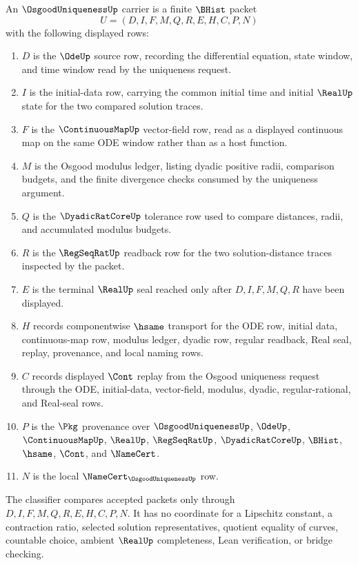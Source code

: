 \begin{definition}
\label{def:osgood-uniqueness-carrier}
An $\OsgoodUniquenessUp$ carrier is a finite $\BHist$ packet
$$
U=(D,I,F,M,Q,R,E,H,C,P,N)
$$
with the following displayed rows:
\begin{enumerate}
\item $D$ is the $\OdeUp$ source row, recording the differential equation, state window, and time window read by the uniqueness request.
\item $I$ is the initial-data row, carrying the common initial time and initial $\RealUp$ state for the two compared solution traces.
\item $F$ is the $\ContinuousMapUp$ vector-field row, read as a displayed continuous map on the same ODE window rather than as a host function.
\item $M$ is the Osgood modulus ledger, listing dyadic positive radii, comparison budgets, and the finite divergence checks consumed by the uniqueness argument.
\item $Q$ is the $\DyadicRatCoreUp$ tolerance row used to compare distances, radii, and accumulated modulus budgets.
\item $R$ is the $\RegSeqRatUp$ readback row for the two solution-distance traces inspected by the packet.
\item $E$ is the terminal $\RealUp$ seal reached only after $D,I,F,M,Q,R$ have been displayed.
\item $H$ records componentwise $\hsame$ transport for the ODE row, initial data, continuous-map row, modulus ledger, dyadic row, regular readback, Real seal, replay, provenance, and local naming rows.
\item $C$ records displayed $\Cont$ replay from the Osgood uniqueness request through the ODE, initial-data, vector-field, modulus, dyadic, regular-rational, and Real-seal rows.
\item $P$ is the $\Pkg$ provenance over $\OsgoodUniquenessUp$, $\OdeUp$, $\ContinuousMapUp$, $\RealUp$, $\RegSeqRatUp$, $\DyadicRatCoreUp$, $\BHist$, $\hsame$, $\Cont$, and $\NameCert$.
\item $N$ is the local $\NameCert_{\OsgoodUniquenessUp}$ row.
\end{enumerate}
The classifier compares accepted packets only through $D,I,F,M,Q,R,E,H,C,P,N$. It has no coordinate for a Lipschitz constant, a contraction ratio, selected solution representatives, quotient equality of curves, countable choice, ambient $\RealUp$ completeness, Lean verification, or bridge checking.
\end{definition}


